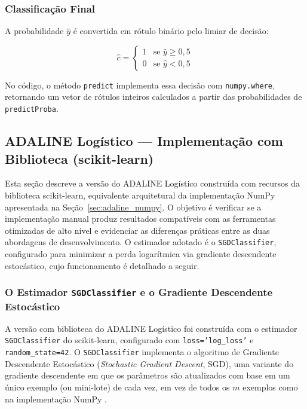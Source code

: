 \subsubsection{Classificação Final}

A probabilidade $\hat{y}$ é convertida em rótulo binário pelo limiar de decisão:

\begin{equation}
\hat{c} = \begin{cases} 1 & \text{se } \hat{y} \geq 0{,}5 \\ 0 & \text{se } \hat{y} < 0{,}5 \end{cases}
\label{eq:adaline_thresh}
\end{equation}

No código, o método \texttt{predict} implementa essa decisão com \texttt{numpy.where}, retornando um vetor de rótulos inteiros calculados a partir das probabilidades de \texttt{predictProba}.

\subsection{ADALINE Logístico --- Implementação com Biblioteca (scikit-learn)}
\label{sec:adaline_sklearn}

Esta seção descreve a versão do ADALINE Logístico construída com recursos da biblioteca scikit-learn, equivalente arquitetural da implementação NumPy apresentada na Seção~\ref{sec:adaline_numpy}. O objetivo é verificar se a implementação manual produz resultados compatíveis com as ferramentas otimizadas de alto nível e evidenciar as diferenças práticas entre as duas abordagens de desenvolvimento. O estimador adotado é o \texttt{SGDClassifier}, configurado para minimizar a perda logarítmica via gradiente descendente estocástico, cujo funcionamento é detalhado a seguir.

\subsubsection{O Estimador \texttt{SGDClassifier} e o Gradiente Descendente Estocástico}

A versão com biblioteca do ADALINE Logístico foi construída com o estimador \texttt{SGDClassifier} do scikit-learn, configurado com \texttt{loss='log\_loss'} e \texttt{random\_state=42}. O \texttt{SGDClassifier} implementa o algoritmo de Gradiente Descendente Estocástico (\textit{Stochastic Gradient Descent}, SGD), uma variante do gradiente descendente em que os parâmetros são atualizados com base em um único exemplo (ou mini-lote) de cada vez, em vez de todos os $m$ exemplos como na implementação NumPy \cite{silva2016}.

